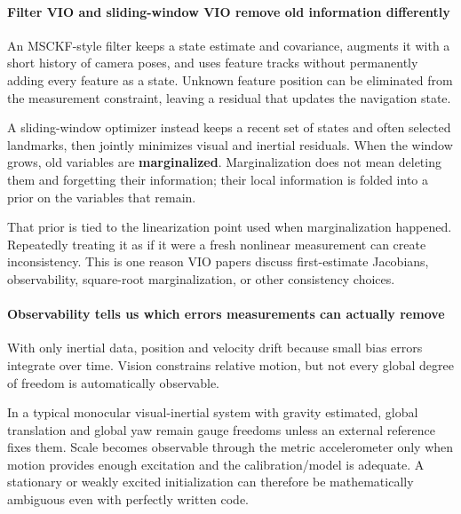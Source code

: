 \paragraph{Filter VIO and sliding-window VIO remove old information differently}\label{04-visual-computing-ii-ch035-filter-vio-and-sliding-window-vio-remove-old-information-differently}

An MSCKF-style filter keeps a state estimate and covariance, augments it with a short history of camera poses, and uses feature tracks without permanently adding every feature as a state. Unknown feature position can be eliminated from the measurement constraint, leaving a residual that updates the navigation state.

A sliding-window optimizer instead keeps a recent set of states and often selected landmarks, then jointly minimizes visual and inertial residuals. When the window grows, old variables are \textbf{marginalized}. Marginalization does not mean deleting them and forgetting their information; their local information is folded into a prior on the variables that remain.

That prior is tied to the linearization point used when marginalization happened. Repeatedly treating it as if it were a fresh nonlinear measurement can create inconsistency. This is one reason VIO papers discuss first-estimate Jacobians, observability, square-root marginalization, or other consistency choices.

\paragraph{Observability tells us which errors measurements can actually remove}\label{04-visual-computing-ii-ch035-observability-tells-us-which-errors-measurements-can-actually-remove}

With only inertial data, position and velocity drift because small bias errors integrate over time. Vision constrains relative motion, but not every global degree of freedom is automatically observable.

In a typical monocular visual-inertial system with gravity estimated, global translation and global yaw remain gauge freedoms unless an external reference fixes them. Scale becomes observable through the metric accelerometer only when motion provides enough excitation and the calibration/model is adequate. A stationary or weakly excited initialization can therefore be mathematically ambiguous even with perfectly written code.

